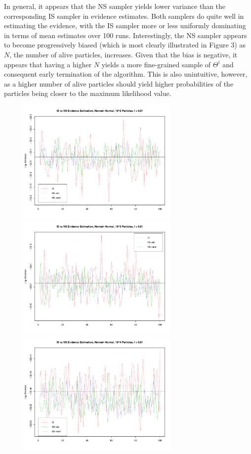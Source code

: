 \documentclass[psamsfonts]{amsart}
\begin{document}
In general, it appears that the NS sampler yields lower variance than the corresponding IS sampler in evidence estimates. Both samplers do quite well in estimating the evidence, with the IS sampler more or less uniformly dominating in terms of mean estimates over 100 runs. Interestingly, the NS sampler appears to become progressively biased (which is most clearly illustrated in Figure 3) as $N$, the number of alive particles, increases. Given that the bias is negative, it appears that having a higher $N$ yields a more fine-grained sample of $\Theta^i$ and consequent early termination of the algorithm. This is also unintuitive, however, as a higher number of alive particles should yield higher probabilities of the particles being closer to the maximum likelihood value.

\begin{figure}
\includegraphics[width=0.7\textwidth]{N-N_10e2_f01_rand.pdf}

\includegraphics[width=0.7\textwidth]{N-N_10e3_f01_rand.pdf}

\includegraphics[width=0.7\textwidth]{N-N_10e4_f01_rand.pdf}


\end{figure}
\end{document}
